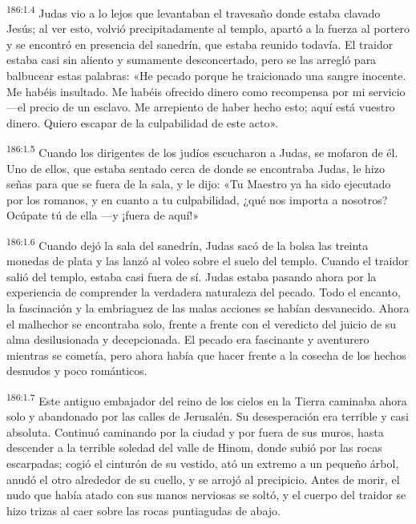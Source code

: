 \par 
\textsuperscript{186:1.4} Judas vio a lo lejos que levantaban el travesaño donde estaba clavado Jesús; al ver esto, volvió precipitadamente al templo, apartó a la fuerza al portero y se encontró en presencia del sanedrín, que estaba reunido todavía. El traidor estaba casi sin aliento y sumamente desconcertado, pero se las arregló para balbucear estas palabras: «He pecado porque he traicionado una sangre inocente. Me habéis insultado. Me habéis ofrecido dinero como recompensa por mi servicio ---el precio de un esclavo. Me arrepiento de haber hecho esto; aquí está vuestro dinero. Quiero escapar de la culpabilidad de este acto».

\par 
\textsuperscript{186:1.5} Cuando los dirigentes de los judíos escucharon a Judas, se mofaron de él. Uno de ellos, que estaba sentado cerca de donde se encontraba Judas, le hizo señas para que se fuera de la sala, y le dijo: «Tu Maestro ya ha sido ejecutado por los romanos, y en cuanto a tu culpabilidad, ¿qué nos importa a nosotros? Ocúpate tú de ella ---y ¡fuera de aquí!»

\par 
\textsuperscript{186:1.6} Cuando dejó la sala del sanedrín, Judas sacó de la bolsa las treinta monedas de plata y las lanzó al voleo sobre el suelo del templo. Cuando el traidor salió del templo, estaba casi fuera de sí. Judas estaba pasando ahora por la experiencia de comprender la verdadera naturaleza del pecado. Todo el encanto, la fascinación y la embriaguez de las malas acciones se habían desvanecido. Ahora el malhechor se encontraba solo, frente a frente con el veredicto del juicio de su alma desilusionada y decepcionada. El pecado era fascinante y aventurero mientras se cometía, pero ahora había que hacer frente a la cosecha de los hechos desnudos y poco románticos.

\par 
\textsuperscript{186:1.7} Este antiguo embajador del reino de los cielos en la Tierra caminaba ahora solo y abandonado por las calles de Jerusalén. Su desesperación era terrible y casi absoluta. Continuó caminando por la ciudad y por fuera de sus muros, hasta descender a la terrible soledad del valle de Hinom, donde subió por las rocas escarpadas; cogió el cinturón de su vestido, ató un extremo a un pequeño árbol, anudó el otro alrededor de su cuello, y se arrojó al precipicio. Antes de morir, el nudo que había atado con sus manos nerviosas se soltó, y el cuerpo del traidor se hizo trizas al caer sobre las rocas puntiagudas de abajo.

